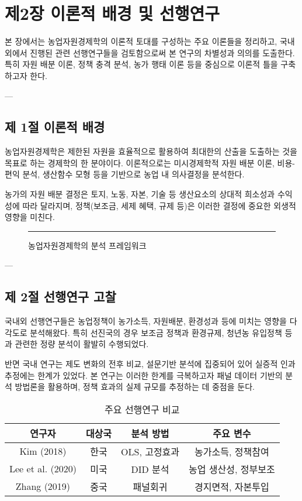 \chapter*{제2장 이론적 배경 및 선행연구}\label{chap:chapter2}

본 장에서는 농업자원경제학의 이론적 토대를 구성하는 주요 이론들을 정리하고,  
국내외에서 진행된 관련 선행연구들을 검토함으로써 본 연구의 차별성과 의의를 도출한다.  
특히 자원 배분 이론, 정책 충격 분석, 농가 행태 이론 등을 중심으로 이론적 틀을 구축하고자 한다.

---

\section*{제 1절 이론적 배경}\label{sec:chapter2_1}

농업자원경제학은 제한된 자원을 효율적으로 활용하여 최대한의 산출을 도출하는 것을 목표로 하는 경제학의 한 분야이다.  
이론적으로는 미시경제학적 자원 배분 이론, 비용-편익 분석, 생산함수 모형 등을 기반으로 농업 내 의사결정을 분석한다.

농가의 자원 배분 결정은 토지, 노동, 자본, 기술 등 생산요소의 상대적 희소성과 수익성에 따라 달라지며,  
정책(보조금, 세제 혜택, 규제 등)은 이러한 결정에 중요한 외생적 영향을 미친다.

\begin{figure}[htbp]
  \centering
  \rule{0.8\linewidth}{5cm} %
  \caption{농업자원경제학의 분석 프레임워크}\label{fig:chapter2_1}
\end{figure}

---

\section*{제 2절 선행연구 고찰}\label{sec:chapter2_2}

국내외 선행연구들은 농업정책이 농가소득, 자원배분, 환경성과 등에 미치는 영향을 다각도로 분석해왔다.  
특히 선진국의 경우 보조금 정책과 환경규제, 청년농 유입정책 등과 관련한 정량 분석이 활발히 수행되었다.  

반면 국내 연구는 제도 변화의 전후 비교, 설문기반 분석에 집중되어 있어 실증적 인과 추정에는 한계가 있었다.  
본 연구는 이러한 한계를 극복하고자 패널 데이터 기반의 분석 방법론을 활용하며,  
정책 효과의 실제 규모를 추정하는 데 중점을 둔다.

\begin{table}[htbp]
  \centering
  \begin{tabular}{|c|c|c|c|}
    \hline
    연구자 & 대상국 & 분석 방법 & 주요 변수 \\
    \hline
    Kim (2018) & 한국 & OLS, 고정효과 & 농가소득, 정책참여 \\
    Lee et al. (2020) & 미국 & DID 분석 & 농업 생산성, 정부보조 \\
    Zhang (2019) & 중국 & 패널회귀 & 경지면적, 자본투입 \\
    \hline
  \end{tabular}
  \caption{주요 선행연구 비교}\label{tab:chapter2_1}
\end{table}

